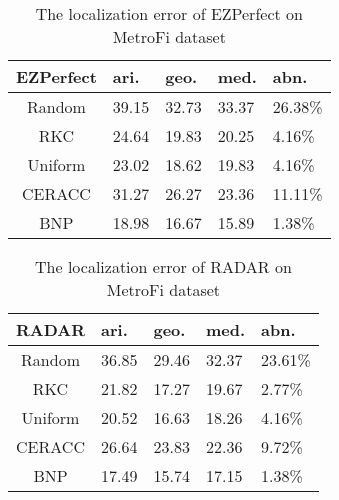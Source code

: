 \documentclass[10pt, conference, letterpaper]{IEEEtran}
\begin{document}
\begin{table}[!t]
\renewcommand{\arraystretch}{1.0}
\caption{The localization error of EZPerfect on MetroFi dataset} \label{experiment_error_MetroFi_EZPerfect}
\centering
\begin{tabular}{|c|p{0.9cm}|p{0.9cm}|p{0.9cm}|p{0.9cm}|}
  \hline
EZPerfect  & ari. & geo. & med. & abn. \\
  \hline
  Random & 39.15 & 32.73 & 33.37 & 26.38\% \\
  \hline
  RKC & 24.64 & 19.83 & 20.25 & 4.16\% \\
  \hline
  Uniform & 23.02 & 18.62 & 19.83 & 4.16\% \\
  \hline
  CERACC & 31.27 & 26.27 & 23.36 & 11.11\% \\
  \hline
  BNP & 18.98 & 16.67 & 15.89 & 1.38\% \\
  \hline
\end{tabular}
\end{table}

\begin{table}[!t]
\renewcommand{\arraystretch}{1.0}
\caption{The localization error of RADAR on MetroFi dataset} \label{experiment_error_MetroFi_RADAR}
\centering
\begin{tabular}{|c|p{0.9cm}|p{0.9cm}|p{0.9cm}|p{0.9cm}|}
  \hline
RADAR  & ari. & geo. & med. & abn. \\
  \hline
  Random & 36.85 & 29.46 & 32.37 & 23.61\% \\
  \hline
  RKC & 21.82 & 17.27 & 19.67 & 2.77\% \\
  \hline
  Uniform & 20.52 & 16.63 & 18.26 & 4.16\% \\
  \hline
  CERACC & 26.64 & 23.83 & 22.36 & 9.72\% \\
  \hline
  BNP & 17.49 & 15.74 & 17.15 & 1.38\% \\
  \hline
\end{tabular}
\end{table}

\vspace{-1.8ex}
\end{document}
